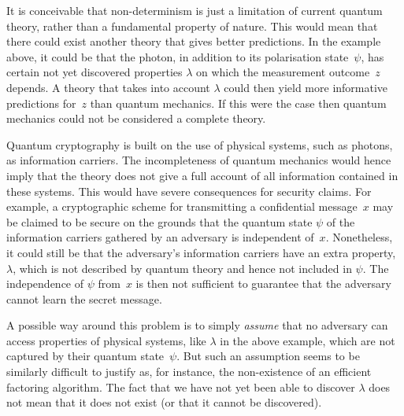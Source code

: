 It is  conceivable that non-determinism is just a limitation of current quantum theory, rather than a fundamental property of nature. This would mean that there could exist another theory that gives better predictions. In the example above, it could be that the photon, in addition to its polarisation state~$\psi$, has certain not yet discovered properties $\lambda$ on which the measurement outcome~$z$ depends.  A theory that takes into account $\lambda$ could then yield more informative predictions for~$z$ than quantum mechanics. If this were the case then quantum mechanics could not be considered a complete theory. 

Quantum cryptography is built on the use of physical systems, such as photons, as information carriers. The incompleteness of quantum mechanics would hence imply that the theory does not give a full account of all  information contained in these systems. This would have severe consequences for security claims. For example, a  cryptographic scheme for transmitting a confidential message~$x$ may be claimed to be secure on the grounds that the quantum state $\psi$ of the information carriers  gathered by an adversary  is independent of~$x$. Nonetheless, it could still be that the adversary's information carriers have an extra property, $\lambda$, which is not described by quantum theory and hence not included in $\psi$. The independence of $\psi$ from~$x$ is then not sufficient to guarantee that the adversary cannot learn the secret message.

A possible way around this problem is to simply \emph{assume} that no adversary can access properties of physical systems, like $\lambda$ in the above example, which are not captured by their quantum state~$\psi$. But such an assumption seems to be similarly difficult to justify as, for instance, the non-existence of an efficient factoring algorithm. The fact that we have not yet been able to discover $\lambda$ does not mean that it does not exist (or that it cannot be discovered). 

